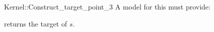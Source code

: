 \begin{ccRefFunctionObjectConcept}{Kernel::Construct_target_point_3}
A model for this must provide:


{returns the target of $s$.}

\end{ccRefFunctionObjectConcept}
